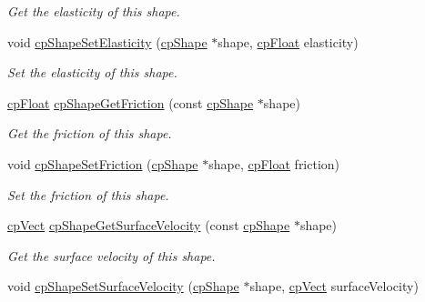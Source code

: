 \begin{DoxyCompactItemize}
\begin{DoxyCompactList}\small\item\em Get the elasticity of this shape. \end{DoxyCompactList}\item 
\hypertarget{group__cp_shape_ga1a70bb8a3865672e8a72ca31b04dab5a}{}void \hyperlink{group__cp_shape_ga1a70bb8a3865672e8a72ca31b04dab5a}{cp\+Shape\+Set\+Elasticity} (\hyperlink{structcp_shape}{cp\+Shape} $\ast$shape, \hyperlink{group__basic_types_gac1ed65573e035bf892505768c852d8d3}{cp\+Float} elasticity)\label{group__cp_shape_ga1a70bb8a3865672e8a72ca31b04dab5a}

\begin{DoxyCompactList}\small\item\em Set the elasticity of this shape. \end{DoxyCompactList}\item 
\hypertarget{group__cp_shape_ga11fbbf292269a50faf2133ef4189e10a}{}\hyperlink{group__basic_types_gac1ed65573e035bf892505768c852d8d3}{cp\+Float} \hyperlink{group__cp_shape_ga11fbbf292269a50faf2133ef4189e10a}{cp\+Shape\+Get\+Friction} (const \hyperlink{structcp_shape}{cp\+Shape} $\ast$shape)\label{group__cp_shape_ga11fbbf292269a50faf2133ef4189e10a}

\begin{DoxyCompactList}\small\item\em Get the friction of this shape. \end{DoxyCompactList}\item 
\hypertarget{group__cp_shape_gaecf3e16558fc080673b13e4b2cc1589d}{}void \hyperlink{group__cp_shape_gaecf3e16558fc080673b13e4b2cc1589d}{cp\+Shape\+Set\+Friction} (\hyperlink{structcp_shape}{cp\+Shape} $\ast$shape, \hyperlink{group__basic_types_gac1ed65573e035bf892505768c852d8d3}{cp\+Float} friction)\label{group__cp_shape_gaecf3e16558fc080673b13e4b2cc1589d}

\begin{DoxyCompactList}\small\item\em Set the friction of this shape. \end{DoxyCompactList}\item 
\hypertarget{group__cp_shape_ga6041753827fc7fe7aca1232a36df830d}{}\hyperlink{structcp_vect}{cp\+Vect} \hyperlink{group__cp_shape_ga6041753827fc7fe7aca1232a36df830d}{cp\+Shape\+Get\+Surface\+Velocity} (const \hyperlink{structcp_shape}{cp\+Shape} $\ast$shape)\label{group__cp_shape_ga6041753827fc7fe7aca1232a36df830d}

\begin{DoxyCompactList}\small\item\em Get the surface velocity of this shape. \end{DoxyCompactList}\item 
\hypertarget{group__cp_shape_gae0b3d04de80a9ea2f86aa7bf31024543}{}void \hyperlink{group__cp_shape_gae0b3d04de80a9ea2f86aa7bf31024543}{cp\+Shape\+Set\+Surface\+Velocity} (\hyperlink{structcp_shape}{cp\+Shape} $\ast$shape, \hyperlink{structcp_vect}{cp\+Vect} surface\+Velocity)\label{group__cp_shape_gae0b3d04de80a9ea2f86aa7bf31024543}


\end{DoxyCompactItemize}
